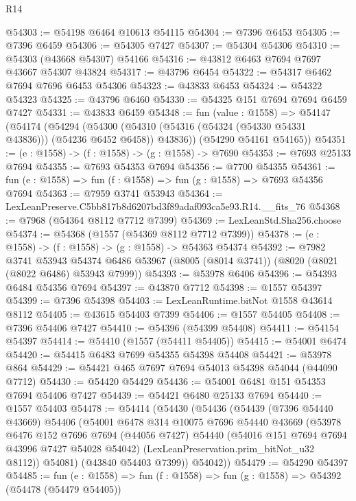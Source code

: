 \begin{lexlean}{R14}
\begin{coremodule}
@54303 := @54198 @6464 @10613 @54115
@54304 := @7396 @6453
@54305 := @7396 @6459
@54306 := @54305 @7427
@54307 := @54304 @54306
@54310 := @54303 (@43668 @54307) @54166
@54316 := @43812 @6463 @7694 @7697 @43667 @54307 @43824
@54317 := @43796 @6454
@54322 := @54317 @6462 @7694 @7696 @6453 @54306
@54323 := @43833 @6453
@54324 := @54322 @54323
@54325 := @43796 @6460
@54330 := @54325 @151 @7694 @7694 @6459 @7427
@54331 := @43833 @6459
@54348 := fun (value : @1558) =>
  @54147
    (@54174
      (@54294
        (@54300 (@54310 (@54316 (@54324 (@54330 @54331 @43836))) (@54236 @6452 @6458)) @43836))
      (@54290 @54161 @54165))
@54351 := (e : @1558) -> (f : @1558) -> (g : @1558) -> @7690
@54353 := @7693 @25133 @7694
@54355 := @7693 @54353 @7694
@54356 := @7700 @54355
@54361 := fun (e : @1558) => fun (f : @1558) => fun (g : @1558) => @7693 @54356 @7694
@54363 := @7959 @3741 @53943
@54364 := LexLeanPreserve.C5bb817b8d6207bd3f89adaf093ca5e93.R14.__fits_76
@54368 := @7968 (@54364 @8112 @7712 @7399)
@54369 := LexLeanStd.Sha256.choose
@54374 := @54368 (@1557 (@54369 @8112 @7712 @7399))
@54378 := (e : @1558) -> (f : @1558) -> (g : @1558) -> @54363 @54374
@54392 := @7982
    @3741
    @53943
    @54374
    @6486
    @53967
    (@8005 (@8014 @3741))
    (@8020 (@8021 (@8022 @6486) @53943 @7999))
@54393 := @53978 @6406
@54396 := @54393 @6484 @54356 @7694
@54397 := @43870 @7712
@54398 := @1557 @54397
@54399 := @7396 @54398
@54403 := LexLeanRuntime.bitNot @1558 @43614 @8112
@54405 := @43615 @54403 @7399
@54406 := @1557 @54405
@54408 := @7396 @54406 @7427
@54410 := @54396 (@54399 @54408)
@54411 := @54154 @54397
@54414 := @54410 (@1557 (@54411 @54405))
@54415 := @54001 @6474
@54420 := @54415 @6483 @7699 @54355 @54398 @54408
@54421 := @53978 @864
@54429 := @54421 @465 @7697 @7694 @54013 @54398 @54044 (@44090 @7712)
@54430 := @54420 @54429
@54436 := @54001 @6481 @151 @54353 @7694 @54406 @7427
@54439 := @54421 @6480 @25133 @7694
@54440 := @1557 @54403
@54478 := @54414
    (@54430
      (@54436
        (@54439
          (@7396 @54440 @43669)
          @54406
          (@54001
            @6478
            @314
            @10075
            @7696
            @54440
            @43669
            (@53978
              @6476
              @152
              @7696
              @7694
              (@44056 @7427)
              @54440
              (@54016 @151 @7694 @7694 @43996 @7427 @54028 @54042)
              (LexLeanPreservation.prim_bitNot_u32 @8112))
            @54081)
          (@43840 @54403 @7399))
        @54042))
@54479 := @54290 @54397
@54485 := fun (e : @1558) => fun (f : @1558) => fun (g : @1558) => @54392 (@54478 (@54479 @54405))

\end{coremodule}
\end{lexlean}
